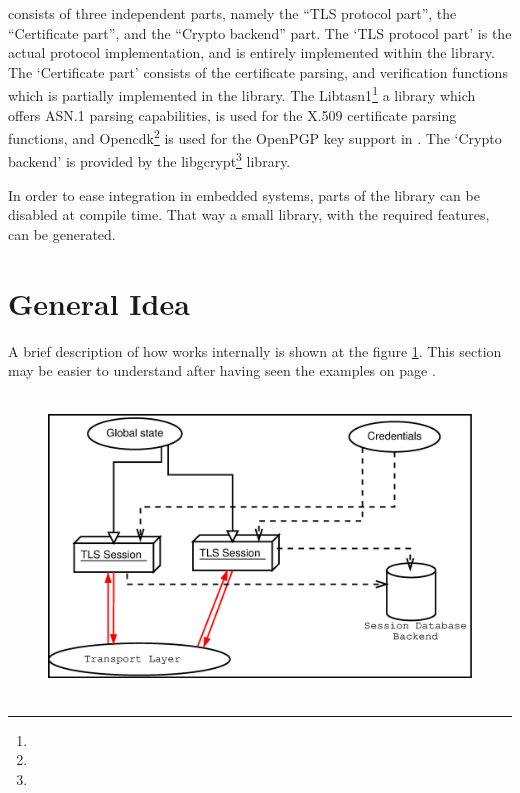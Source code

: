 \par 
\gnutls{} consists of three
independent parts, namely the ``TLS protocol part'', the ``Certificate part'', and 
the ``Crypto backend'' part.
The `TLS protocol part' is the actual protocol implementation, and is entirely
implemented within the \gnutls{} library.
The `Certificate part' consists of the certificate parsing, and verification
functions which is partially implemented in the \gnutls{} library. The
Libtasn1\footnote{}
a library which offers ASN.1 parsing capabilities, is used for the
X.509 certificate parsing functions, and
Opencdk\footnote{}
is used for the OpenPGP key support in \gnutls{}.
The `Crypto backend' is provided by the 
libgcrypt\footnote{}
library.
\par
In order to ease integration in embedded systems, parts of the \gnutls{} library 
can be disabled at compile time. That way a small library, with the required features,
can be generated.

\section{General Idea}
A brief description of how \gnutls{} works internally is shown at
the figure \ref{fig:internals}. This section may be easier to understand
after having seen the examples on page \pageref{examples}.

\begin{figure}[htp]
\includegraphics[height=8cm,width=12cm]{internals}
\label{fig:internals}
\end{figure}

